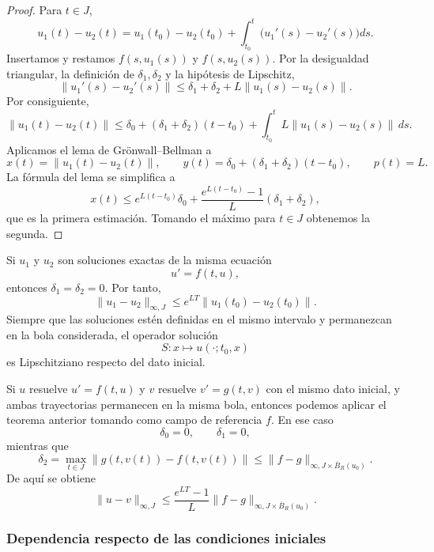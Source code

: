 \begin{proof}
    Para $t\in J$,
    \[
        u_1(t)-u_2(t)
        =u_1(t_0)-u_2(t_0)
        +\int_{t_0}^t\bigl(u_1'(s)-u_2'(s)\bigr)ds.
    \]
    Insertamos y restamos $f(s,u_1(s))$ y $f(s,u_2(s))$. Por la desigualdad triangular, la definición de $\delta_1,\delta_2$ y la hipótesis de Lipschitz,
    \[
        \|u_1'(s)-u_2'(s)\|
        \leq
        \delta_1+\delta_2+L\|u_1(s)-u_2(s)\|.
    \]
    Por consiguiente,
    \[
        \|u_1(t)-u_2(t)\|
        \leq
        \delta_0+(\delta_1+\delta_2)(t-t_0)
        +\int_{t_0}^t L\|u_1(s)-u_2(s)\|\,ds.
    \]
    Aplicamos el lema de Grönwall--Bellman a
    \[
        x(t)=\|u_1(t)-u_2(t)\|,
        \qquad
        y(t)=\delta_0+(\delta_1+\delta_2)(t-t_0),
        \qquad
        p(t)=L.
    \]
    La fórmula del lema se simplifica a
    \[
        x(t)
        \leq
        e^{L(t-t_0)}\delta_0
        +\frac{e^{L(t-t_0)}-1}{L}(\delta_1+\delta_2),
    \]
    que es la primera estimación. Tomando el máximo para $t\in J$ obtenemos la segunda.
\end{proof}

\begin{observación}
    Si $u_1$ y $u_2$ son soluciones exactas de la misma ecuación
    \[
        u'=f(t,u),
    \]
    entonces $\delta_1=\delta_2=0$. Por tanto,
    \[
        \|u_1-u_2\|_{\infty,J}
        \leq e^{LT}\|u_1(t_0)-u_2(t_0)\|.
    \]
    Siempre que las soluciones estén definidas en el mismo intervalo y permanezcan en la bola considerada, el operador solución
    \[
        S:x\longmapsto u(\cdot;t_0,x)
    \]
    es Lipschitziano respecto del dato inicial.
\end{observación}

\begin{observación}
    Si $u$ resuelve $u'=f(t,u)$ y $v$ resuelve $v'=g(t,v)$ con el mismo dato inicial, y ambas trayectorias permanecen en la misma bola, entonces podemos aplicar el teorema anterior tomando como campo de referencia $f$. En ese caso
    \[
        \delta_0=0,\qquad \delta_1=0,
    \]
    mientras que
    \[
        \delta_2
        =\max_{t\in J}\|g(t,v(t))-f(t,v(t))\|
        \leq\|f-g\|_{\infty,J\times\overline{B}_R(u_0)}.
    \]
    De aquí se obtiene
    \[
        \|u-v\|_{\infty,J}
        \leq
        \frac{e^{LT}-1}{L}
        \|f-g\|_{\infty,J\times\overline{B}_R(u_0)}.
    \]
\end{observación}

\subsubsection{Dependencia respecto de las condiciones iniciales}


